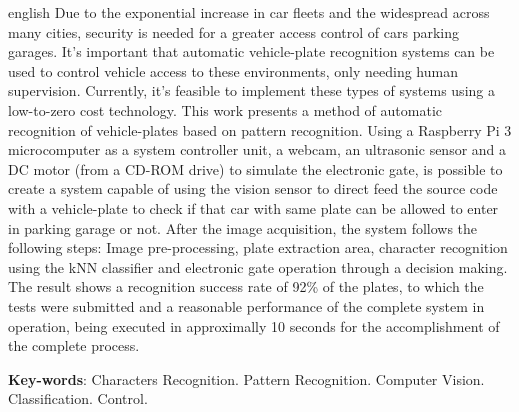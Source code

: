 \begin{resumo}[Abstract]
 \begin{otherlanguage*}{english}
Due to the exponential increase in car fleets and the widespread across many cities, security is needed for a greater access control of cars parking garages. It's important that automatic vehicle-plate recognition systems can be used to control vehicle access to these environments, only needing human supervision. Currently, it's feasible to implement these types of systems using a low-to-zero cost technology. This work presents a method of automatic recognition of vehicle-plates based on pattern recognition. Using a Raspberry Pi 3 microcomputer as a system controller unit, a webcam, an ultrasonic sensor and a DC motor (from a CD-ROM drive) to simulate the electronic gate, is possible to create a system capable of using the vision sensor to direct feed the source code with a vehicle-plate to check if that car with same plate can be allowed to enter in parking garage or not. After the image acquisition, the system follows the following steps: Image pre-processing, plate extraction area, character recognition using the kNN classifier and electronic gate operation through a decision making. The result shows a recognition success rate of 92\% of the plates, to which the tests were submitted and a reasonable performance of the complete system in operation, being executed in approximally 10 seconds for the accomplishment of the complete process.

   \vspace{\onelineskip}
 
   \noindent 
   \textbf{Key-words}: Characters Recognition. Pattern Recognition. Computer Vision. Classification. Control.
 \end{otherlanguage*}
\end{resumo}


% 
%
%  

